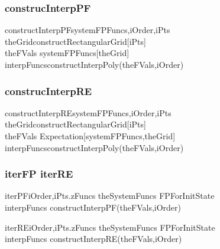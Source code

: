 \documentclass{beamer}
\begin{document}
\begin{frame}
\frametitle{construcInterpPF}
\label{sec:code}

\begin{pseudocode}{constructInterpPF}{systemFPFuncs,iOrder,iPts}
theGrid\GETS constructRectangularGrid[iPts]\\
theFVals \GETS systemFPFuncs[theGrid]\\
interpFuncs\GETS constructInterpPoly(theFVals,iOrder)\\
\end{pseudocode}
\end{frame}


\begin{frame}
\frametitle{construcInterpRE}
\label{sec:code}

\begin{pseudocode}{constructInterpRE}{systemFPFuncs,iOrder,iPts}
theGrid\GETS constructRectangularGrid[iPts]\\
theFVals \GETS Expectation[systemFPFuncs,theGrid]\\
interpFuncs\GETS constructInterpPoly(theFVals,iOrder)\\
\end{pseudocode}
\end{frame}



\begin{frame}
\frametitle{iterFP iterRE}
\label{sec:code}


\begin{pseudocode}{iterPF}{iOrder,iPts.zFuncs}
theSystemFuncs \GETS FPForInitState\\
interpFuncs \GETS constructInterpPF(theFVals,iOrder)\\
\end{pseudocode}
\begin{pseudocode}{iterRE}{iOrder,iPts.zFuncs}
theSystemFuncs \GETS FPForInitState\\
interpFuncs \GETS constructInterpRE(theFVals,iOrder)\\
\end{pseudocode}
\end{frame}



\newpage
\end{document}
